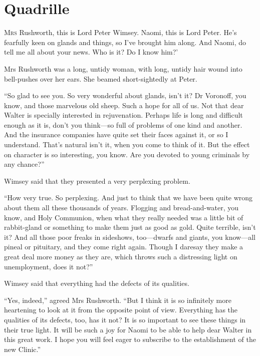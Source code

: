 \chapter{Quadrille}

\lettrine[lines=4,ante=‘]{M}{rs} Rushworth, this is Lord Peter Wimsey. Naomi, this is Lord Peter. He's fearfully keen on glands and things, so I've brought him along. And Naomi, do tell me all about your news. Who is it? Do I know him?'

Mrs Rushworth was a long, untidy woman, with long, untidy hair wound into bell-pushes over her ears. She beamed short-sightedly at Peter.

\enquote{So glad to see you. So very wonderful about glands, isn't it? Dr Voronoff, you know, and those marvelous old sheep. Such a hope for all of us. Not that dear Walter is specially interested in rejuvenation. Perhaps life is long and difficult enough as it is, don't you think\allowbreak---\allowbreak so full of problems of one kind and another. And the insurance companies have quite set their faces against it, or so I understand. That's natural isn't it, when you come to think of it. But the effect on character is so interesting, you know. Are you devoted to young criminals by any chance?}

Wimsey said that they presented a very perplexing problem.

\enquote{How very true. So perplexing. And just to think that we have been quite wrong about them all these thousands of years. Flogging and bread-and-water, you know, and Holy Communion, when what they really needed was a little bit of rabbit-gland or something to make them just as good as gold. Quite terrible, isn't it? And all those poor freaks in sideshows, too\allowbreak---\allowbreak dwarfs and giants, you know\allowbreak---\allowbreak all pineal or pituitary, and they come right again. Though I daresay they make a great deal more money as they are, which throws such a distressing light on unemployment, does it not?}

Wimsey said that everything had the defects of its qualities.

\enquote{Yes, indeed,} agreed Mrs Rushworth. \enquote{But I think it is so infinitely more heartening to look at it from the opposite point of view. Everything has the qualities of its defects, too, has it not? It is so important to see these things in their true light. It will be such a joy for Naomi to be able to help dear Walter in this great work. I hope you will feel eager to subscribe to the establishment of the new Clinic.}

